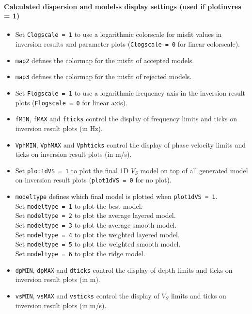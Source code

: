 \documentclass[twoside,a4paper]{article}
\begin{document}
\paragraph{Calculated dispersion and modelss display settings (used if plotinvres = 1)}
\begin{itemize}[leftmargin=*]
\setlength\itemsep{2ex}

\item Set \verb|Clogscale = 1| to use a logarithmic colorscale for misfit values in inversion results and parameter plots (\verb|Clogscale = 0| for linear colorscale).

\item \verb|map2| defines the colormap for the misfit of accepted models.

\item \verb|map3| defines the colormap for the misfit of rejected models.\\[2ex]

\item Set \verb|Flogscale = 1| to use a logarithmic frequency axis in the inversion result plots (\verb|Flogscale = 0| for linear axis).

\item \verb|fMIN|, \verb|fMAX| and \verb|fticks| control the display of frequency limits and ticks on inversion result plots (in Hz).

\item \verb|VphMIN|, \verb|VphMAX| and \verb|Vphticks| control the display of phase velocity limits and ticks on inversion result plots (in m/s).\\[2ex]

\item Set \verb|plot1dVS = 1| to plot the final 1D $V_S$ model on top of all generated model on inversion result plots (\verb|plot1dVS = 0| for no plot).

\item \verb|modeltype| defines which final model is plotted when \verb|plot1dVS = 1|.\\[1ex]
Set \verb|modeltype = 1| to plot the best model.\\[1ex]
Set \verb|modeltype = 2| to plot the average layered model.\\[1ex]
Set \verb|modeltype = 3| to plot the average smooth model.\\[1ex]
Set \verb|modeltype = 4| to plot the weighted layered model.\\[1ex]
Set \verb|modeltype = 5| to plot the weighted smooth model.\\[1ex]
Set \verb|modeltype = 6| to plot the ridge model.\\[2ex]

\item \verb|dpMIN|, \verb|dpMAX| and \verb|dticks| control the display of depth limits and ticks on inversion result plots (in m).

\item \verb|vsMIN|, \verb|vsMAX| and \verb|vsticks| control the display of $V_S$ limits and ticks on inversion result plots (in m/s).
\end{itemize}
\end{document}
